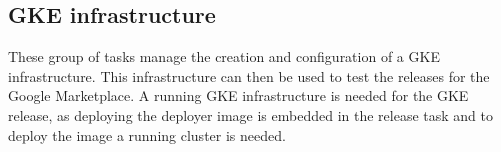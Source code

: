 \subsection{GKE infrastructure}\label{subsec:gke-infrastructure}


These group of tasks manage the creation and configuration of a GKE infrastructure.
This infrastructure can then be used to test the releases for the Google Marketplace.
A running GKE infrastructure is needed for the GKE release, as deploying the deployer image is embedded in the release task and to deploy the image a running cluster is needed.





